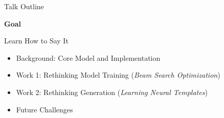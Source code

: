 
\begin{frame}{Talk Outline}
  \begin{center}
    \textbf{Goal}


    Learn How to Say It
  \end{center}
  \pause
  \air


  \begin{itemize}
  \item Background: Core Model and Implementation
    \air
  \item Work 1: Rethinking Model Training (\textit{Beam Search Optimization})
    \air

  \item Work 2: Rethinking  Generation  (\textit{Learning Neural Templates})
    \air

  \item Future Challenges 
  \end{itemize}
\end{frame}


